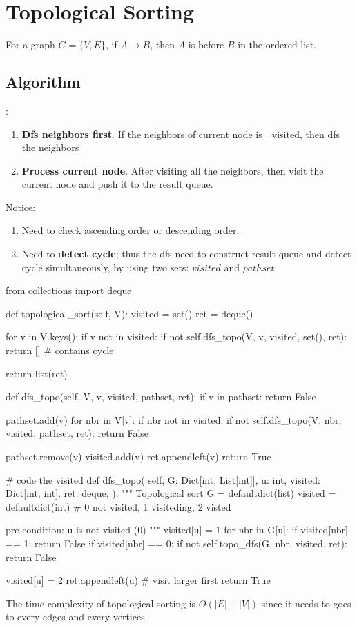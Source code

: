 \section{Topological Sorting}
For a graph $G=\{V, E\}$, if $A \rightarrow B $, then $A$ is before $B$ in the ordered list.
\subsection{Algorithm}
:
\begin{enumerate}
\item \textbf{Dfs neighbors first}. If the neighbors of current node is  $\neg$visited, then dfs the neighbors
\item \textbf{Process current node}. After visiting all the neighbors, then visit the current node and push it to the result queue.

\end{enumerate}
Notice:
\begin{enumerate}
\item Need to check ascending order or descending order.
\item Need to \textbf{detect cycle}; thus the dfs need to construct result queue and detect cycle simultaneously, by using two sets: $visited$ and $pathset$.
\end{enumerate}
\newpage
\begin{python}
from collections import deque

def topological_sort(self, V):
  visited = set()
  ret = deque()

  for v in V.keys():
    if v not in visited:
      if not self.dfs_topo(V, v, visited, set(), ret):
        return []  # contains cycle

  return list(ret)

def dfs_topo(self, V, v, visited, pathset, ret):
  if v in pathset:
    return False

  pathset.add(v)
  for nbr in V[v]:
    if nbr not in visited:
      if not self.dfs_topo(V, nbr, visited, pathset, ret):
        return False

  pathset.remove(v)
  visited.add(v)
  ret.appendleft(v)
  return True

# code the visited 
def dfs_topo(
  self, 
  G: Dict[int, List[int]], 
  u: int, 
  visited: Dict[int, int],
  ret: deque,
):
  """
  Topological sort
  G = defaultdict(list)
  visited = defaultdict(int) 
  # 0 not visited, 1 visiteding, 2 visted

  pre-condition: u is not visited (0)
  """
  visited[u] = 1
  for nbr in G[u]:
    if visited[nbr] == 1:
      return False
    if visited[nbr] == 0:
      if not self.topo_dfs(G, nbr, visited, ret):
        return False

  visited[u] = 2
  ret.appendleft(u)  # visit larger first
  return True
\end{python}
The time complexity of topological sorting is $O(|E|+|V|)$ since it needs to goes to every edges and every vertices. 

